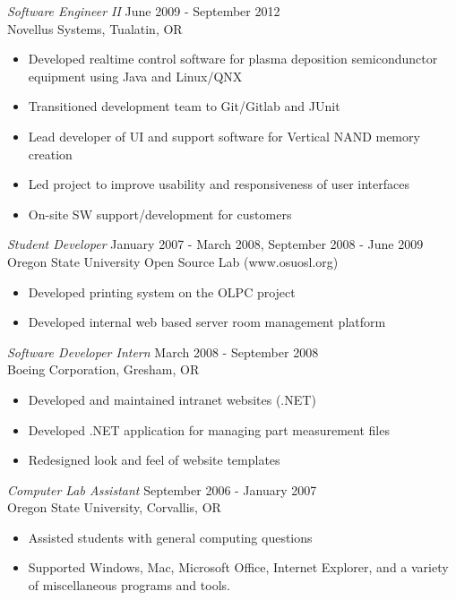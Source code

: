 \documentclass[margin]{res}
\begin{document}
\begin{resume}
                {\sl Software Engineer II} \hfill June 2009 -  September 2012 \\
                Novellus Systems,  Tualatin, OR
                 \begin{itemize}  \itemsep -2pt %
                     \item Developed realtime control software for plasma deposition semicondunctor equipment using Java and Linux/QNX
                     \item Transitioned development team to Git/Gitlab and JUnit
                     \item Lead developer of UI and support software for Vertical NAND memory creation
                     \item Led project to improve usability and responsiveness of user interfaces
                     \item On-site SW support/development for customers
                \end{itemize}
 \newpage
                {\sl Student Developer} \hfill            January 2007 - March 2008, September 2008 - June 2009 \\
                Oregon State University Open Source Lab (www.osuosl.org)
                 \begin{itemize}  \itemsep -2pt %
                     \item Developed printing system on the OLPC project
                     \item Developed internal web based server room management platform
                 \end{itemize}

                {\sl Software Developer Intern} \hfill         March 2008 - September 2008\\
                Boeing Corporation, Gresham, OR
               	\begin{itemize}  \itemsep -2pt %
                    \item Developed and maintained intranet websites (.NET)
                    \item Developed .NET application for managing part measurement files
                    \item Redesigned look and feel of website templates
               	\end{itemize}

                {\sl Computer Lab Assistant} \hfill         September 2006 - January 2007\\
                Oregon State University, Corvallis, OR
                \begin{itemize}  \itemsep -2pt %
                    \item Assisted students with general computing questions
                    \item Supported Windows, Mac, Microsoft Office, Internet Explorer, and a variety
                        of miscellaneous programs and tools.
                \end{itemize}
\end{resume}
\end{document}
